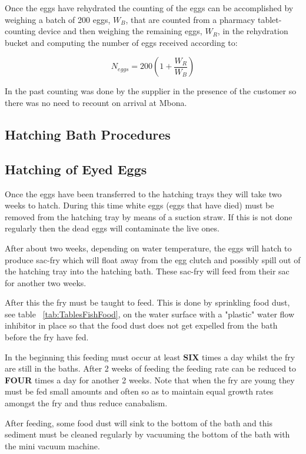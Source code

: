 Once the eggs have rehydrated the counting of the eggs can be accomplished by weighing a batch of 200 eggs, $W_B$, that are counted from a pharmacy tablet-counting device and then weighing the remaining eggs, $W_R$, in the rehydration bucket and computing the number of eggs received according to:
            
    $$ N_{eggs} = 200(1 + \frac{W_R} {W_B} ) $$
    
     In the past counting was done by the supplier in the presence of the customer so there was no need to recount on arrival at Mbona. 
     
     

\subsection{Hatching Bath Procedures}

  

\subsection{Hatching of Eyed Eggs}

Once the eggs have been transferred to the hatching trays they will take two weeks to hatch.
During this time white eggs (eggs that have died) must be removed from the hatching tray by
means of a suction straw. If this is not done regularly then the dead eggs will contaminate the live ones.  
\marginpar{2 \W}

After about two weeks, depending on water temperature, the eggs will hatch to produce sac-fry 
which will float away from the egg clutch and 
possibly spill out of the hatching tray into the hatching bath. These sac-fry will feed from their sac for another two weeks. 

After this the fry must be taught to feed. This is done by sprinkling food dust, see table ~\ref{tab:TablesFishFood}, on the water surface with a "plastic" water flow inhibitor in place
so that the food dust does not get expelled from the bath before the fry have fed.
\marginpar{4 \W}

In the beginning this feeding must occur at least {\bf SIX} times a day whilst the fry are still in the baths.
After 2 weeks of feeding the feeding rate can be reduced to {\bf FOUR} times a day for another 2 weeks.
Note that when the fry are young they must be fed small amounts and often so as to maintain equal growth rates amongst the fry and thus reduce canabalism. 

After feeding, some food dust will sink to the bottom of the bath and this sediment must be cleaned 
regularly by  vacuuming the bottom of the bath with the mini vacuum machine.
     

